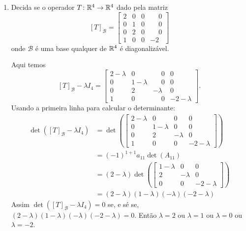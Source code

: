 \begin{exemplo}
\begin{enumerate}[label={\arabic*})]
        \item Decida se o operador $T \colon \mathbb{R}^4 \to \mathbb{R}^4$ dado pela matriz
            \[
                [T]_\mathcal{B} = \begin{bmatrix}2 & 0 & 0 &\phantom{-}0\\0 & 1 & 0 & \phantom{-}0\\0 & 2 & 0 & \phantom{-}0\\1 & 0 & 0 & -2\end{bmatrix}
            \]
            onde $\mathcal{B}$ é uma base qualquer de $\mathbb{R}^4$ é diagonalizável.
            \begin{solucao}
                Aqui temos
                \[
                    [T]_\mathcal{B} - \lambda I_4 = \begin{bmatrix}2 - \lambda & 0 & \phantom{-}0 & 0\\0 & 1 - \lambda & \phantom{-}0 & 0\\0 & 2 & -\lambda & 0\\1 & 0 & \phantom{-}0 & -2 - \lambda\end{bmatrix}.
                \]
                Usando a primeira linha para calcular o determinante:
                \begin{align*}
                    \det([T]_\mathcal{B} - \lambda I_4) &= \det\left(\begin{bmatrix}2 - \lambda & 0 & 0 & 0\\0 & 1 - \lambda & 0 & 0\\0 & 2 & -\lambda & 0\\1 & 0 & 0 & -2 - \lambda\end{bmatrix}\right) \\ &= (-1)^{1 + 1}a_{11}\det(A_{11}) \\ &= (2 - \lambda)\det\left(\begin{bmatrix}1 - \lambda & 0 & 0\\2 & -\lambda & 0\\0 & 0 & -2 - \lambda\end{bmatrix}\right) \\ &= (2 - \lambda)(1 - \lambda)(-\lambda)(-2 - \lambda)
                \end{align*}
                Assim $\det([T]_\mathcal{B} - \lambda I_4) = 0$ se, e sé se, $(2 - \lambda)(1 - \lambda)(-\lambda)(-2 - \lambda) = 0$. Então $\lambda = 2$ ou $\lambda = 1$ ou $\lambda = 0$ ou $\lambda = -2$.


\end{solucao}
\end{enumerate}
\end{exemplo}
